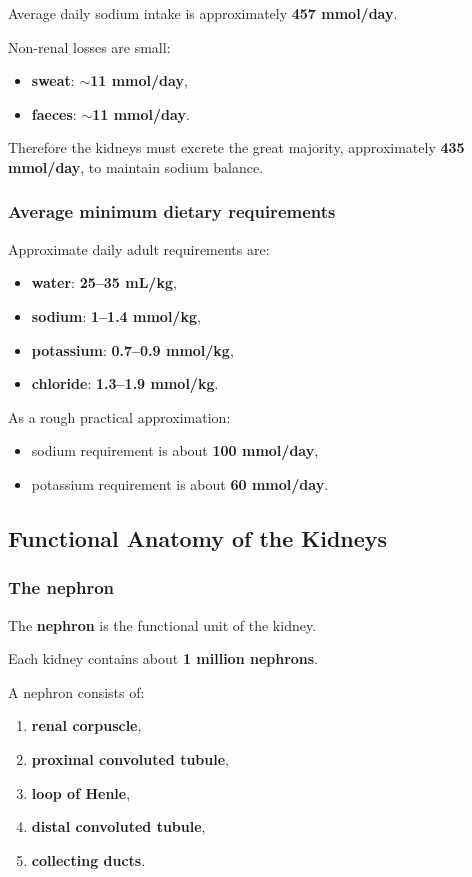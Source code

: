 \documentclass[11pt,a4paper]{article}
\begin{document}
Average daily sodium intake is approximately \textbf{457 mmol/day}.

Non-renal losses are small:
\begin{itemize}
    \item \textbf{sweat}: \(\sim\)\textbf{11 mmol/day},
    \item \textbf{faeces}: \(\sim\)\textbf{11 mmol/day}.
\end{itemize}

Therefore the kidneys must excrete the great majority, approximately \textbf{435 mmol/day}, to maintain sodium balance.

\subsubsection{Average minimum dietary requirements}

Approximate daily adult requirements are:
\begin{itemize}
    \item \textbf{water}: \textbf{25--35 mL/kg},
    \item \textbf{sodium}: \textbf{1--1.4 mmol/kg},
    \item \textbf{potassium}: \textbf{0.7--0.9 mmol/kg},
    \item \textbf{chloride}: \textbf{1.3--1.9 mmol/kg}.
\end{itemize}

As a rough practical approximation:
\begin{itemize}
    \item sodium requirement is about \textbf{100 mmol/day},
    \item potassium requirement is about \textbf{60 mmol/day}.
\end{itemize}

\subsection{Functional Anatomy of the Kidneys}

\subsubsection{The nephron}

The \textbf{nephron} is the functional unit of the kidney.

Each kidney contains about \textbf{1 million nephrons}.

A nephron consists of:
\begin{enumerate}
    \item \textbf{renal corpuscle},
    \item \textbf{proximal convoluted tubule},
    \item \textbf{loop of Henle},
    \item \textbf{distal convoluted tubule},
    \item \textbf{collecting ducts}.
\end{enumerate}
\end{document}
